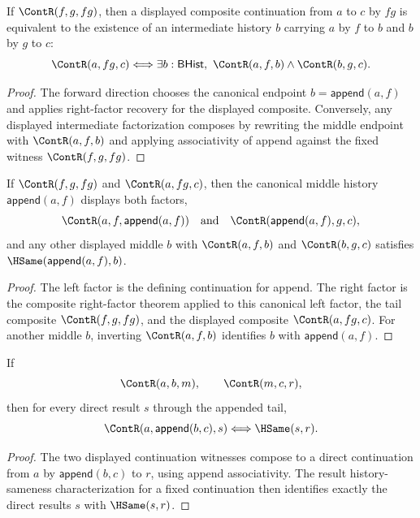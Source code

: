 \begin{theorem}
\label{thm:cont-composite-factorization-iff}
If $\ContR(f,g,fg)$, then a displayed composite continuation from $a$ to $c$
by $fg$ is equivalent to the existence of an intermediate history $b$ carrying
$a$ by $f$ to $b$ and $b$ by $g$ to $c$:
$$
\ContR(a,fg,c)
\Longleftrightarrow
\exists b:\mathsf{BHist},\ \ContR(a,f,b)\wedge \ContR(b,g,c).
$$
\end{theorem}
\begin{proof}
The forward direction chooses the canonical endpoint
$b=\mathsf{append}(a,f)$ and applies right-factor recovery for the displayed
composite. Conversely, any displayed intermediate factorization composes by
rewriting the middle endpoint with $\ContR(a,f,b)$ and applying associativity
of append against the fixed witness $\ContR(f,g,fg)$.
\end{proof}

\begin{theorem}
\label{thm:cont-composite-canonical-middle-public-readback}
If $\ContR(f,g,fg)$ and $\ContR(a,fg,c)$, then the canonical middle history
$\mathsf{append}(a,f)$ displays both factors,
$$
\ContR(a,f,\mathsf{append}(a,f))
\quad\text{and}\quad
\ContR(\mathsf{append}(a,f),g,c),
$$
and any other displayed middle $b$ with $\ContR(a,f,b)$ and $\ContR(b,g,c)$
satisfies $\HSame(\mathsf{append}(a,f),b)$.
\end{theorem}
\begin{proof}
The left factor is the defining continuation for append. The right factor is
the composite right-factor theorem applied to this canonical left factor, the
tail composite $\ContR(f,g,fg)$, and the displayed composite $\ContR(a,fg,c)$.
For another middle $b$, inverting $\ContR(a,f,b)$ identifies $b$ with
$\mathsf{append}(a,f)$.
\end{proof}

\begin{theorem}
\label{thm:cont-factorization-result-hsame-iff}
If
$$
\ContR(a,b,m),\qquad \ContR(m,c,r),
$$
then for every direct result $s$ through the appended tail,
$$
\ContR(a,\mathsf{append}(b,c),s)
\Longleftrightarrow
\HSame(s,r).
$$
\end{theorem}
\begin{proof}
The two displayed continuation witnesses compose to a direct continuation
from $a$ by $\mathsf{append}(b,c)$ to $r$, using append associativity. The
result history-sameness characterization for a fixed continuation then
identifies exactly the direct results $s$ with $\HSame(s,r)$.
\end{proof}

